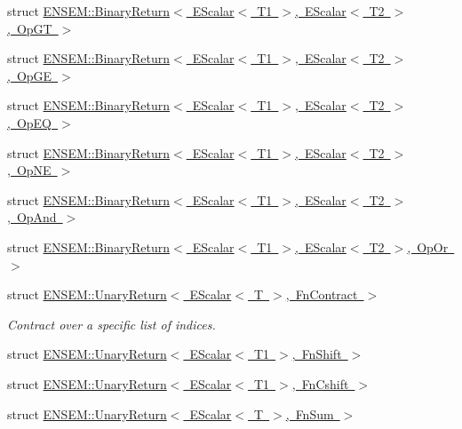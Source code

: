 \begin{DoxyCompactItemize}
\item 
struct \mbox{\hyperlink{structENSEM_1_1BinaryReturn_3_01EScalar_3_01T1_01_4_00_01EScalar_3_01T2_01_4_00_01OpGT_01_4}{E\+N\+S\+E\+M\+::\+Binary\+Return$<$ E\+Scalar$<$ T1 $>$, E\+Scalar$<$ T2 $>$, Op\+G\+T $>$}}
\item 
struct \mbox{\hyperlink{structENSEM_1_1BinaryReturn_3_01EScalar_3_01T1_01_4_00_01EScalar_3_01T2_01_4_00_01OpGE_01_4}{E\+N\+S\+E\+M\+::\+Binary\+Return$<$ E\+Scalar$<$ T1 $>$, E\+Scalar$<$ T2 $>$, Op\+G\+E $>$}}
\item 
struct \mbox{\hyperlink{structENSEM_1_1BinaryReturn_3_01EScalar_3_01T1_01_4_00_01EScalar_3_01T2_01_4_00_01OpEQ_01_4}{E\+N\+S\+E\+M\+::\+Binary\+Return$<$ E\+Scalar$<$ T1 $>$, E\+Scalar$<$ T2 $>$, Op\+E\+Q $>$}}
\item 
struct \mbox{\hyperlink{structENSEM_1_1BinaryReturn_3_01EScalar_3_01T1_01_4_00_01EScalar_3_01T2_01_4_00_01OpNE_01_4}{E\+N\+S\+E\+M\+::\+Binary\+Return$<$ E\+Scalar$<$ T1 $>$, E\+Scalar$<$ T2 $>$, Op\+N\+E $>$}}
\item 
struct \mbox{\hyperlink{structENSEM_1_1BinaryReturn_3_01EScalar_3_01T1_01_4_00_01EScalar_3_01T2_01_4_00_01OpAnd_01_4}{E\+N\+S\+E\+M\+::\+Binary\+Return$<$ E\+Scalar$<$ T1 $>$, E\+Scalar$<$ T2 $>$, Op\+And $>$}}
\item 
struct \mbox{\hyperlink{structENSEM_1_1BinaryReturn_3_01EScalar_3_01T1_01_4_00_01EScalar_3_01T2_01_4_00_01OpOr_01_4}{E\+N\+S\+E\+M\+::\+Binary\+Return$<$ E\+Scalar$<$ T1 $>$, E\+Scalar$<$ T2 $>$, Op\+Or $>$}}
\item 
struct \mbox{\hyperlink{structENSEM_1_1UnaryReturn_3_01EScalar_3_01T_01_4_00_01FnContract_01_4}{E\+N\+S\+E\+M\+::\+Unary\+Return$<$ E\+Scalar$<$ T $>$, Fn\+Contract $>$}}
\begin{DoxyCompactList}\small\item\em Contract over a specific list of indices. \end{DoxyCompactList}\item 
struct \mbox{\hyperlink{structENSEM_1_1UnaryReturn_3_01EScalar_3_01T1_01_4_00_01FnShift_01_4}{E\+N\+S\+E\+M\+::\+Unary\+Return$<$ E\+Scalar$<$ T1 $>$, Fn\+Shift $>$}}
\item 
struct \mbox{\hyperlink{structENSEM_1_1UnaryReturn_3_01EScalar_3_01T1_01_4_00_01FnCshift_01_4}{E\+N\+S\+E\+M\+::\+Unary\+Return$<$ E\+Scalar$<$ T1 $>$, Fn\+Cshift $>$}}
\item 
struct \mbox{\hyperlink{structENSEM_1_1UnaryReturn_3_01EScalar_3_01T_01_4_00_01FnSum_01_4}{E\+N\+S\+E\+M\+::\+Unary\+Return$<$ E\+Scalar$<$ T $>$, Fn\+Sum $>$}}

\end{DoxyCompactItemize}
